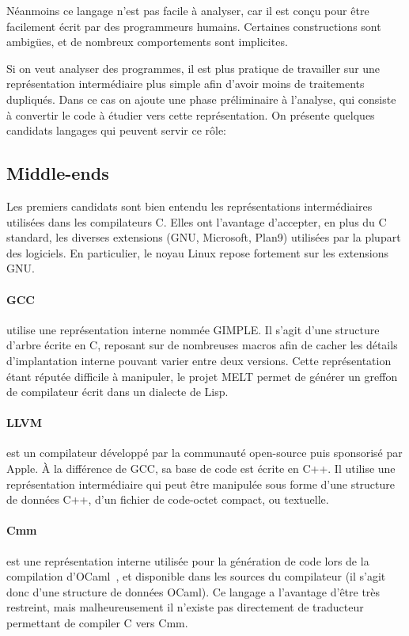 Néanmoins ce langage n'est pas facile à analyser, car il est conçu pour être
facilement écrit par des programmeurs humains. Certaines constructions sont
ambigües, et de nombreux comportements sont implicites.

Si on veut analyser des programmes, il est plus pratique de travailler sur une
représentation intermédiaire plus simple afin d'avoir moins de traitements
dupliqués. Dans ce cas on ajoute une phase préliminaire à l'analyse, qui
consiste à convertir le code à étudier vers cette représentation. On présente
quelques candidats langages qui peuvent servir ce rôle:

\subsection*{Middle-ends}

Les premiers candidats sont bien entendu les représentations intermédiaires
utilisées dans les compilateurs C. Elles ont l'avantage d'accepter, en plus du C
standard, les diverses extensions (GNU, Microsoft, Plan9) utilisées par la
plupart des logiciels. En particulier, le noyau Linux repose fortement sur les
extensions GNU.\@

\paragraph{GCC} utilise une représentation interne nommée
GIMPLE\cite{gcc-gimple}. Il s'agit d'une structure d'arbre écrite en C, reposant
sur de nombreuses macros afin de cacher les détails d'implantation interne
pouvant varier entre deux versions. Cette représentation étant réputée difficile
à manipuler, le projet MELT\cite{gcc-melt} permet de générer un greffon de
compilateur écrit dans un dialecte de Lisp.

\paragraph{LLVM}\cite{llvm-pres} est un compilateur développé par la communauté
open-source puis sponsorisé par Apple. À la différence de GCC, sa base de code
est écrite en C++. Il utilise une représentation intermédiaire qui peut être
manipulée sous forme d'une structure de données C++, d'un fichier de code-octet
compact, ou textuelle.

\paragraph{Cmm} est une représentation interne utilisée pour la génération de
code lors de la compilation d'OCaml~, et disponible dans les sources
du compilateur (il s'agit donc d'une structure de données OCaml). Ce langage a
l'avantage d'être très restreint, mais malheureusement il n'existe pas
directement de traducteur permettant de compiler C vers Cmm.

